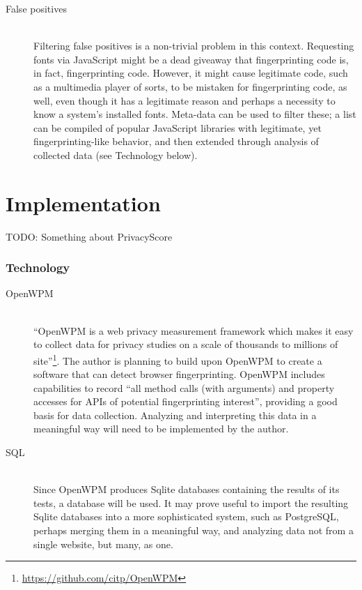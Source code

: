 \documentclass[a4paper, 12pt]{scrreprt}
\begin{document}
\begin{description}
        \item[False positives] \hfill \\
            Filtering false positives is a non-trivial problem in this context. Requesting fonts via JavaScript might be a dead giveaway
            that fingerprinting code is, in fact, fingerprinting code. However, it might cause legitimate code, such
            as a multimedia player of sorts, to be mistaken for fingerprinting code, as well, even though it has a legitimate
            reason and perhaps a necessity to know a system's installed fonts.
            Meta-data can be used to filter these; a list can be compiled of popular JavaScript libraries with legitimate,
            yet fingerprinting-like behavior, and then extended through analysis of collected data (see Technology below).
    \end{description}

\chapter{Implementation}
TODO: Something about PrivacyScore

    \subsection{Technology}

    \begin{description}
        \item[OpenWPM] \hfill \\
            ``OpenWPM is a web privacy measurement framework which makes it easy to collect data for privacy studies on a scale
            of thousands to millions of site''\footnote{\url{https://github.com/citp/OpenWPM}}.
            The author is planning to build upon OpenWPM\cite{englehardt2016census} to create a software that can detect
            browser fingerprinting. OpenWPM includes capabilities to record
            ``all method calls (with arguments) and property accesses for APIs of potential fingerprinting interest'',
            providing a good basis for data collection. Analyzing and interpreting this data in a meaningful way
            will need to be implemented by the author.

        \item[SQL] \hfill \\
            Since OpenWPM produces Sqlite databases containing the results of its tests, a database will be used. It may prove useful
            to import the resulting Sqlite databases into a more sophisticated system, such as PostgreSQL, perhaps merging them in a
            meaningful way, and analyzing data not from a single website, but many, as one.
    \end{description}

\clearpage

\printbibliography
\end{document}
